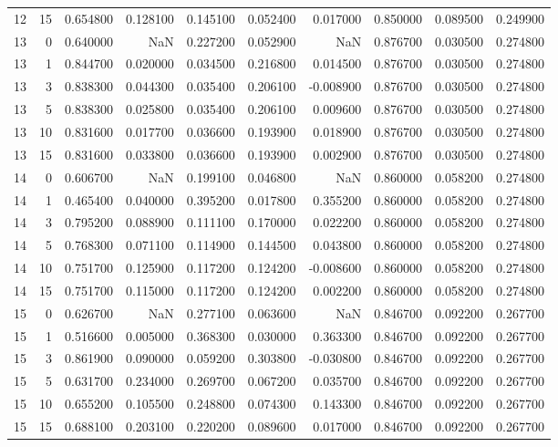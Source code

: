 \begin{table}
\begin{tabular}{rrrrrrrrrr}
12 & 15 & 0.654800 & 0.128100 & 0.145100 & 0.052400 & 0.017000 & 0.850000 & 0.089500 & 0.249900 \\
13 & 0 & 0.640000 & NaN & 0.227200 & 0.052900 & NaN & 0.876700 & 0.030500 & 0.274800 \\
13 & 1 & 0.844700 & 0.020000 & 0.034500 & 0.216800 & 0.014500 & 0.876700 & 0.030500 & 0.274800 \\
13 & 3 & 0.838300 & 0.044300 & 0.035400 & 0.206100 & -0.008900 & 0.876700 & 0.030500 & 0.274800 \\
13 & 5 & 0.838300 & 0.025800 & 0.035400 & 0.206100 & 0.009600 & 0.876700 & 0.030500 & 0.274800 \\
13 & 10 & 0.831600 & 0.017700 & 0.036600 & 0.193900 & 0.018900 & 0.876700 & 0.030500 & 0.274800 \\
13 & 15 & 0.831600 & 0.033800 & 0.036600 & 0.193900 & 0.002900 & 0.876700 & 0.030500 & 0.274800 \\
14 & 0 & 0.606700 & NaN & 0.199100 & 0.046800 & NaN & 0.860000 & 0.058200 & 0.274800 \\
14 & 1 & 0.465400 & 0.040000 & 0.395200 & 0.017800 & 0.355200 & 0.860000 & 0.058200 & 0.274800 \\
14 & 3 & 0.795200 & 0.088900 & 0.111100 & 0.170000 & 0.022200 & 0.860000 & 0.058200 & 0.274800 \\
14 & 5 & 0.768300 & 0.071100 & 0.114900 & 0.144500 & 0.043800 & 0.860000 & 0.058200 & 0.274800 \\
14 & 10 & 0.751700 & 0.125900 & 0.117200 & 0.124200 & -0.008600 & 0.860000 & 0.058200 & 0.274800 \\
14 & 15 & 0.751700 & 0.115000 & 0.117200 & 0.124200 & 0.002200 & 0.860000 & 0.058200 & 0.274800 \\
15 & 0 & 0.626700 & NaN & 0.277100 & 0.063600 & NaN & 0.846700 & 0.092200 & 0.267700 \\
15 & 1 & 0.516600 & 0.005000 & 0.368300 & 0.030000 & 0.363300 & 0.846700 & 0.092200 & 0.267700 \\
15 & 3 & 0.861900 & 0.090000 & 0.059200 & 0.303800 & -0.030800 & 0.846700 & 0.092200 & 0.267700 \\
15 & 5 & 0.631700 & 0.234000 & 0.269700 & 0.067200 & 0.035700 & 0.846700 & 0.092200 & 0.267700 \\
15 & 10 & 0.655200 & 0.105500 & 0.248800 & 0.074300 & 0.143300 & 0.846700 & 0.092200 & 0.267700 \\
15 & 15 & 0.688100 & 0.203100 & 0.220200 & 0.089600 & 0.017000 & 0.846700 & 0.092200 & 0.267700 \\

\end{tabular}
\end{table}
